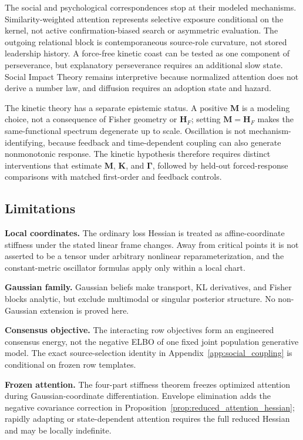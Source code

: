 \documentclass[12pt]{article}
\begin{document}
The social and psychological correspondences stop at their modeled mechanisms. Similarity-weighted attention represents selective exposure conditional on the kernel, not active confirmation-biased search or asymmetric evaluation. The outgoing relational block is contemporaneous source-role curvature, not stored leadership history. A force-free kinetic coast can be tested as one component of perseverance, but explanatory perseverance requires an additional slow state. Social Impact Theory remains interpretive because normalized attention does not derive a number law, and diffusion requires an adoption state and hazard.

The kinetic theory has a separate epistemic status. A positive $\mathbf M$ is a modeling choice, not a consequence of Fisher geometry or $\mathbf H_F$; setting $\mathbf M=\mathbf H_F$ makes the same-functional spectrum degenerate up to scale. Oscillation is not mechanism-identifying, because feedback and time-dependent coupling can also generate nonmonotonic response. The kinetic hypothesis therefore requires distinct interventions that estimate $\mathbf M$, $\mathbf K$, and $\boldsymbol\Gamma$, followed by held-out forced-response comparisons with matched first-order and feedback controls.

\subsection{Limitations}

\textbf{Local coordinates.} The ordinary loss Hessian is treated as affine-coordinate stiffness under the stated linear frame changes. Away from critical points it is not asserted to be a tensor under arbitrary nonlinear reparameterization, and the constant-metric oscillator formulas apply only within a local chart.

\textbf{Gaussian family.} Gaussian beliefs make transport, KL derivatives, and Fisher blocks analytic, but exclude multimodal or singular posterior structure. No non-Gaussian extension is proved here.

\textbf{Consensus objective.} The interacting row objectives form an engineered consensus energy, not the negative ELBO of one fixed joint population generative model. The exact source-selection identity in Appendix~\ref{app:social_coupling} is conditional on frozen row templates.

\textbf{Frozen attention.} The four-part stiffness theorem freezes optimized attention during Gaussian-coordinate differentiation. Envelope elimination adds the negative covariance correction in Proposition~\ref{prop:reduced_attention_hessian}; rapidly adapting or state-dependent attention requires the full reduced Hessian and may be locally indefinite.
\end{document}
